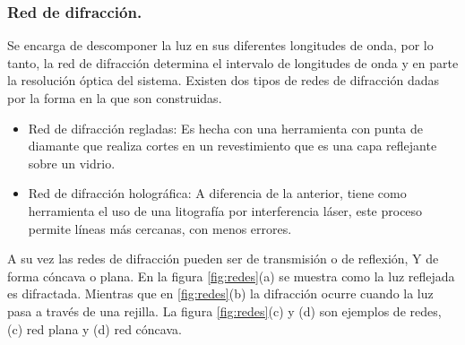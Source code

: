 \subsubsection{Red de difracción.}
Se encarga de descomponer la luz en sus diferentes longitudes de onda, por lo tanto, la red de difracción determina el intervalo de longitudes de onda y en parte la resolución óptica del sistema. 
Existen dos tipos de redes de difracción dadas por la forma en la que son construidas.
\begin{itemize}
	\item Red de difracción regladas: Es hecha con una herramienta con punta de diamante que realiza cortes en un revestimiento que es una capa reflejante sobre un vidrio.
	\item Red de difracción holográfica: A diferencia de la anterior, tiene como herramienta el uso de una litografía por interferencia láser, este proceso permite líneas más cercanas, con menos errores.
\end{itemize}

A su vez las redes de difracción pueden ser de transmisión o de reflexión, Y de forma cóncava o plana. En la figura \ref{fig:redes}(a) se muestra como la luz reflejada es difractada. Mientras que en \ref{fig:redes}(b) la difracción ocurre cuando la luz pasa a través de una rejilla. La figura \ref{fig:redes}(c) y (d) son ejemplos de redes, (c) red plana y (d) red cóncava.


